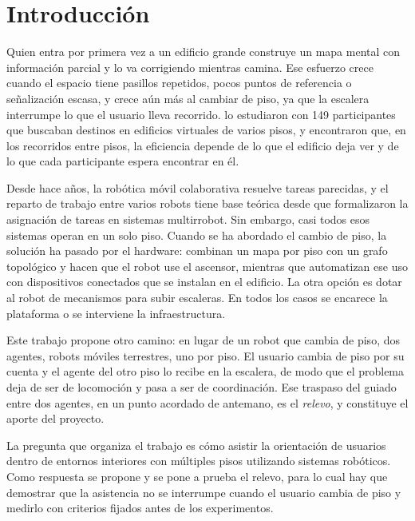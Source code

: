 \chapter*{Introducción}

Quien entra por primera vez a un edificio grande construye un mapa mental con
información parcial y lo va corrigiendo mientras camina. Ese esfuerzo crece cuando el
espacio tiene pasillos repetidos, pocos puntos de referencia o señalización escasa, y
crece aún más al cambiar de piso, ya que la escalera interrumpe lo que el usuario lleva
recorrido. \textcite{gathmorad2024strategic} lo estudiaron con 149 participantes que
buscaban destinos en edificios virtuales de varios pisos, y encontraron que, en los
recorridos entre pisos, la eficiencia depende de lo que el edificio deja ver y de lo
que cada participante espera encontrar en él.

Desde hace años, la robótica móvil colaborativa resuelve tareas parecidas, y el reparto
de trabajo entre varios robots tiene base teórica desde que
\textcite{gerkey2004taxonomy} formalizaron la asignación de tareas en sistemas
multirrobot. Sin embargo, casi todos esos sistemas operan en un solo piso. Cuando se
ha abordado el cambio de piso, la solución ha pasado por el hardware:
\textcite{kim2024indoor} combinan un mapa por piso con un grafo topológico y hacen que
el robot use el ascensor, mientras que \textcite{song2024elevator} automatizan ese uso
con dispositivos conectados que se instalan en el edificio. La otra opción es dotar al
robot de mecanismos para subir escaleras. En todos los casos se encarece la plataforma
o se interviene la infraestructura.

Este trabajo propone otro camino: en lugar de un robot que cambia de piso, dos
agentes, robots móviles terrestres, uno por piso. El usuario cambia de piso por su
cuenta y el agente del otro piso lo recibe en la escalera, de modo que el problema deja
de ser de locomoción y pasa a ser de coordinación. Ese traspaso del guiado entre dos
agentes, en un punto acordado de antemano, es el \emph{relevo}, y constituye el aporte
del proyecto.

La pregunta que organiza el trabajo es cómo asistir la orientación de usuarios dentro
de entornos interiores con múltiples pisos utilizando sistemas robóticos. Como respuesta se propone y se pone a prueba el relevo, para lo cual hay que demostrar que la
asistencia no se interrumpe cuando el usuario cambia de piso y medirlo con criterios
fijados antes de los experimentos.

